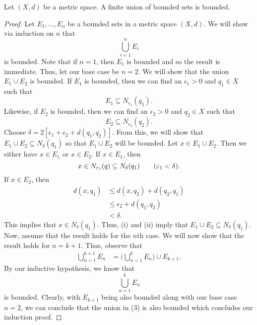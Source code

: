 \documentclass[a4paper]{article}
\begin{document}
\begin{lemma}[2]\label{lemma 2}
    Let \( (X,d) \) be a metric space. A finite union of bounded sets is bounded.    
\end{lemma}
\begin{proof}
    Let \( {E}_{1}, \dots, {E}_{n} \) be a bounded sets in a metric space \( (X,d) \). We will show via induction on \( n  \) that 
    \[  \bigcup_{ i=1  }^{ n } {E}_{i}  \]
    is bounded. Note that if \( n = 1  \), then \( {E}_{1} \) is bounded and so the result is immediate. Thus, let our base case be \( n = 2  \). We will show that the union \( {E}_{1} \cup {E}_{2} \) is bounded. If \( {E}_{1} \) is bounded, then we can find an \( {\epsilon}_{1} > 0  \) and \( {q}_{1} \in X  \) such that 
    \[  {E}_{1} \subseteq {N}_{{\epsilon}_{1}}({q}_{1}). \tag{1} \]
    Likewise, if \( {E}_{2} \) is bounded, then we can find an \( {\epsilon}_{2} > 0  \) and \( {q}_{2} \in X  \) such that 
    \[  {E}_{2} \subseteq {N}_{{\epsilon}_{2}}({q}_{2}). \tag{2} \]
    Choose \( \delta = 2 [ {\epsilon}_{1} + {\epsilon}_{2} + d({q}_{1}, {q}_{2})]  \). From this, we will show that \( {E}_{1} \cup {E}_{2} \subseteq  {N}_{\delta}({q}_{1}) \) so that \( {E}_{1} \cup {E}_{2} \) will be bounded. Let \( x \in {E}_{1} \cup {E}_{2} \). Then we either have \( x \in {E}_{1} \) or \( x \in {E}_{2} \). If \( x \in {E}_{1} \), then   
    \[  x \in {N}_{{\epsilon}_{1}}(q) \subseteq {N}_{\delta}({q}_{1}) \tag{\( {\epsilon}_{1} < \delta \)}. \]
    If \( x \in {E}_{2} \), then 
    \begin{align*}
        d(x,{q}_{1}) &\leq d(x,{q}_{2}) + d({q}_{2}, {q}_{1}) \\
                     &\leq {\epsilon}_{2} + d({q}_{1}, {q}_{2}) \\
                     &< \delta.
    \end{align*} 
    This implies that \( x \in {N}_{\delta}({q}_{1}) \). Thus, (i) and (ii) imply that \( {E}_{1} \cup {E}_{2} \subseteq {N}_{\delta}({q}_{1}) \). Now, assume that the result holds for the \( n \)th case. We will now show that the result holds for \( n = k + 1  \). Thus, observe that 
    \begin{align*}
        \bigcup_{ n=1 }^{ k + 1  } {E}_{n} &= \Big( \bigcup_{ n=1  }^{ k  }  {E}_{n}   \Big) \cup {E}_{k+1}. \tag{3} 
    \end{align*}
    By our inductive hypothesis, we know that 
    \[  \bigcup_{ n=1  }^{ k  }  {E}_{n} \]
    is bounded. Clearly, with \( {E}_{k+1} \) being also bounded along with our base case \( n = 2  \), we can conclude that the union in (3) is also bounded which concludes our induction proof.
\end{proof}
\end{document}
